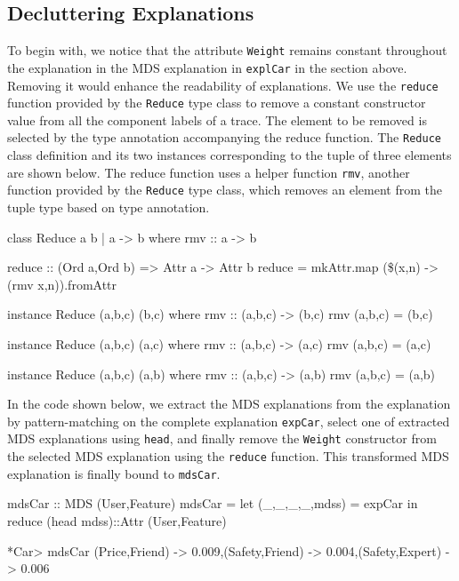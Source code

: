 \documentclass{jfp}
\newcommand{\prog}[1]{\texttt{#1}}
\begin{document}
\subsection{Decluttering Explanations}\label{ReduceExpl}
To begin with, we notice that the attribute \prog{Weight} remains constant throughout the explanation in the MDS explanation in \prog{explCar} in the section above. Removing it would enhance the readability of explanations. We use the \prog{reduce} function provided by the \prog{Reduce} type class to remove a constant constructor value from all the component labels of a trace. The element to be removed is selected by the type annotation accompanying the reduce function. The \prog{Reduce} class definition and its two instances corresponding to the tuple of three elements are shown below. The reduce function uses a helper function \prog{rmv}, another function provided by the \prog{Reduce} type class, which removes an element from the tuple type based on type annotation. 
\begin{haskellcode}
class Reduce a b | a -> b where
  rmv :: a -> b 
  
  reduce :: (Ord a,Ord b) => Attr a -> Attr b 
  reduce = mkAttr.map (\$(x,n) -> (rmv x,n)).fromAttr

instance Reduce (a,b,c) (b,c) where
  rmv :: (a,b,c) -> (b,c)
  rmv (a,b,c) = (b,c)

instance Reduce (a,b,c) (a,c) where
  rmv :: (a,b,c) -> (a,c)
  rmv (a,b,c) = (a,c)

instance Reduce (a,b,c) (a,b) where
  rmv :: (a,b,c) -> (a,b)
  rmv (a,b,c) = (a,b)
\end{haskellcode}
In the code shown below, we extract the MDS explanations from the explanation by pattern-matching on the complete explanation \prog{expCar}, select one of extracted MDS explanations using \prog{head}, and finally remove the \prog{Weight} constructor from the selected MDS explanation using the \prog{reduce} function. This transformed MDS explanation is finally bound to \prog{mdsCar}.
\begin{haskellcode}
mdsCar :: MDS (User,Feature)
mdsCar = let (_,_,_,_,mdss) = expCar
         in  reduce (head mdss)::Attr (User,Feature)
       
*Car> mdsCar
{(Price,Friend) -> 0.009,(Safety,Friend) -> 0.004,(Safety,Expert) -> 0.006}
\end{haskellcode}
\end{document}
